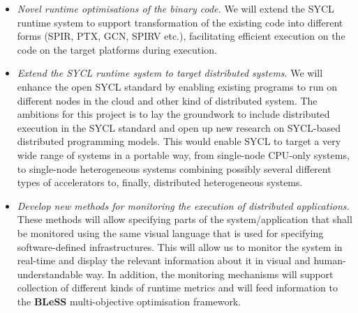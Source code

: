 \documentclass[a4paper,11pt]{article}
\newcommand{\project}[1]{\textbf{#1}\xspace}
\newcommand{\BLESS}{\project{BLeSS}}
\newcommand{\TheProject}{\BLESS}
\begin{document}
\begin{itemize}
\item \emph{Novel runtime optimisations of the binary code.} We will extend the SYCL runtime system to support transformation of the existing code into different forms (SPIR, PTX, GCN, SPIRV etc.), facilitating efficient execution on the code on the target platforms during execution.
\item \emph{Extend the SYCL runtime system to target distributed systems}. We will enhance the open SYCL standard by enabling existing programs to run on different nodes in the cloud and other kind of distributed system. The ambitions for this project is to lay the groundwork to include distributed execution in the SYCL standard and open up new research on SYCL-based distributed programming models. This would enable SYCL to target a very wide range of systems in a portable way, from single-node CPU-only systems, to single-node heterogeneous systems combining possibly several different types of accelerators to, finally, distributed heterogeneous systems.

\item \emph{Develop new methods for monitoring the execution of distributed applications.} These methods will allow specifying parts of the system/application that shall be monitored using the same visual language that is used for specifying software-defined infrastructures. This will allow us to monitor the system in real-time and display the relevant information about it in visual and human-understandable way. In addition, the monitoring mechanisms will support collection of different kinds of runtime metrics and will feed information to the \TheProject{} multi-objective optimisation framework.
\end{itemize}


\end{document}

